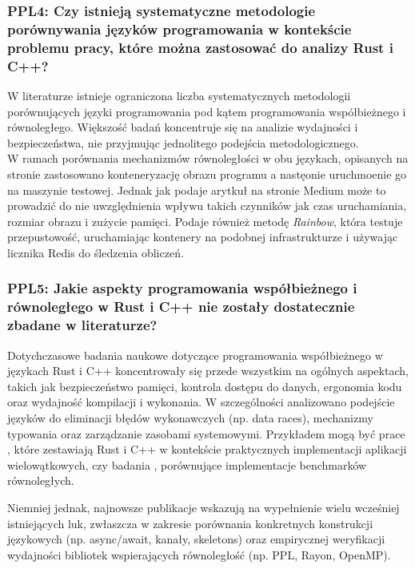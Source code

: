 \subsubsection{PPL4: Czy istnieją systematyczne metodologie porównywania języków programowania w kontekście problemu pracy, które można zastosować do analizy Rust i C++?}
W literaturze istnieje ograniczona liczba systematycznych metodologii porównujących języki programowania pod kątem programowania współbieżnego i równoległego. Większość badań koncentruje się na analizie wydajności i bezpieczeństwa, nie przyjmując jednolitego podejścia metodologicznego.\\
W ramach porównania mechanizmów równoległości w obu językach, opisanych na stronie \cite{parallelrustcppIntroductionComparing} zastosowano konteneryzację obrazu programu a nastęonie uruchmoenie go na maszynie testowej. Jednak jak podaje arytkuł na stronie Medium \cite{rainbow} może to prowadzić do nie uwzględnienia wpływu takich czynników jak czas uruchamiania, rozmiar obrazu i zużycie pamięci. Podaje również metodę \textit{Rainbow}, która testuje przepustowość, uruchamiając kontenery na podobnej infrastrukturze i używając licznika Redis do śledzenia obliczeń.

\subsubsection{PPL5: Jakie aspekty programowania współbieżnego i równoległego w Rust i C++ nie zostały dostatecznie zbadane w literaturze?}
Dotychczasowe badania naukowe dotyczące programowania współbieżnego w językach Rust i C++ koncentrowały się przede wszystkim na ogólnych aspektach, takich jak bezpieczeństwo pamięci, kontrola dostępu do danych, ergonomia kodu oraz wydajność kompilacji i wykonania. W szczególności analizowano podejście języków do eliminacji błędów wykonawczych (np. data races), mechanizmy typowania oraz zarządzanie zasobami systemowymi. Przykładem mogą być prace \cite{heyman2020comparison}, które zestawiają Rust i C++ w kontekście praktycznych implementacji aplikacji wielowątkowych, czy badania \cite{martins2025npbrustnasparallelbenchmarks}, porównujące implementacje benchmarków równoległych.

Niemniej jednak, najnowsze publikacje wskazują na wypełnienie wielu wcześniej istniejących luk, zwłaszcza w zakresie porównania konkretnych konstrukcji językowych (np. async/await, kanały, skeletons) oraz empirycznej weryfikacji wydajności bibliotek wspierających równoległość (np. PPL, Rayon, OpenMP).

